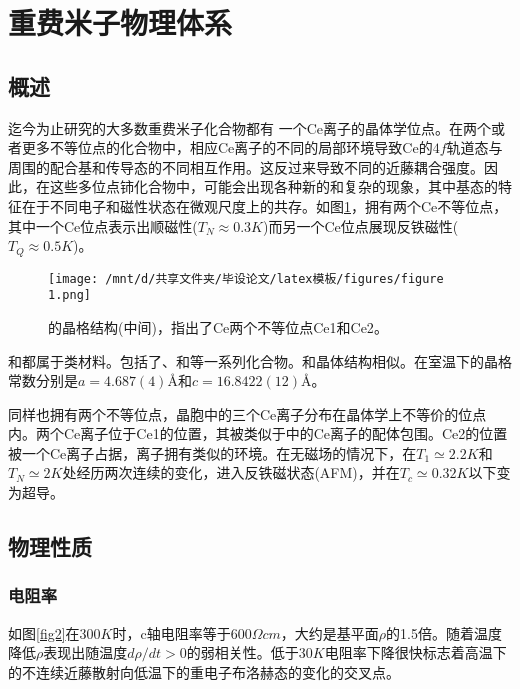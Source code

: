 \section{重费米子物理体系}
\subsection{概述}
迄今为止研究的大多数重费米子化合物都有 一个Ce离子的晶体学位点。在两个或者更多不等位点的化合物中，相应Ce离子的不同的局部环境导致Ce的$4f$轨道态与周围的配合基和传导态的不同相互作用。这反过来导致不同的近藤耦合强度。因此，在这些多位点铈化合物中，可能会出现各种新的和复杂的现象，其中基态的特征在于不同电子和磁性状态在微观尺度上的共存。如图\ref{fig1}，拥有两个Ce不等位点，其中一个Ce位点表示出顺磁性($T_N \approx 0.3K$)而另一个Ce位点展现反铁磁性($T_Q \approx 0.5K$)。

\begin{figure}[h]
    \centering
    \texttt{[image: /mnt/d/共享文件夹/毕设论文/latex模板/figures/figure 1.png]}
    \caption{\Songti {}的晶格结构(中间)，指出了Ce两个不等位点Ce1和Ce2\cite{8}。}%
    \label{fig1}
\end{figure}


和都属于类材料。包括了、和等一系列化合物。和晶体结构相似。在室温下的晶格常数分别是$a=4.687(4)$\AA 和$c=16.8422(12)$\AA。

同样也拥有两个不等位点，晶胞中的三个Ce离子分布在晶体学上不等价的位点内。两个Ce离子位于Ce1的位置，其被类似于中的Ce离子的配体包围。Ce2的位置被一个Ce离子占据，离子拥有类似的环境。在无磁场的情况下，在$T_1 \simeq 2.2K$和$T_N \simeq 2K$处经历两次连续的变化，进入反铁磁状态(AFM)，并在$T_c \simeq 0.32K$以下变为超导。

\subsection{物理性质}
\subsubsection{电阻率}
如图\ref{fig2}在$300K$时，c轴电阻率等于$600 \Omega cm$，大约是基平面$\rho$的1.5倍。随着温度降低$\rho$表现出随温度$d \rho /d t > 0$的弱相关性。低于$30K$电阻率下降很快标志着高温下的不连续近藤散射向低温下的重电子布洛赫态的变化的交叉点。

